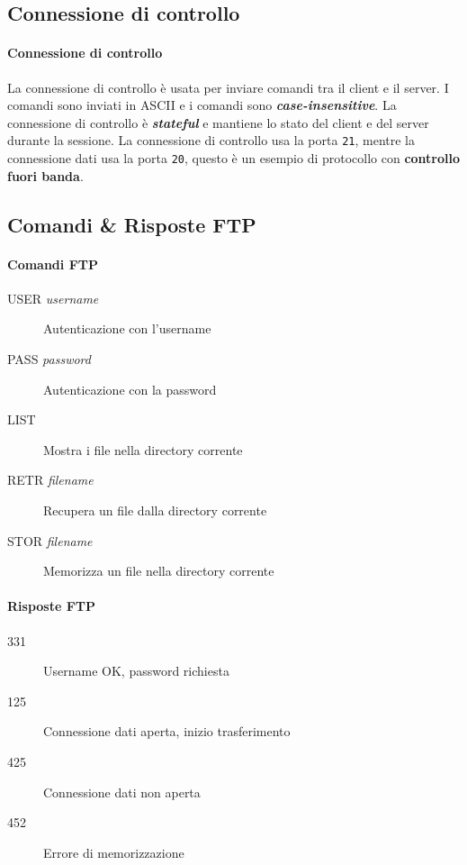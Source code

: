     \subsection{Connessione di controllo}
        \paragraph{Connessione di controllo} La connessione di controllo è usata per inviare comandi tra il client e il server. I comandi sono inviati in \Acrshort*{ASCII} e i comandi sono \textit{\textbf{case-insensitive}}. La connessione di controllo è \textit{\textbf{stateful}} e mantiene lo stato del client e del server durante la sessione. La connessione di controllo usa la porta \texttt{21}, mentre la connessione dati usa la porta \texttt{20}, questo è un esempio di protocollo con \textbf{controllo fuori banda}.
    \subsection[Comandi \& Risposte \texttt{FTP}]{Comandi \& Risposte \Acrshort*{FTP}}
        \paragraph{Comandi \Acrshort*{FTP}}
            \begin{description}
                \item[USER \textit{username}] Autenticazione con l'username
                \item[PASS \textit{password}] Autenticazione con la password
                \item[LIST] Mostra i file nella directory corrente
                \item[RETR \textit{filename}] Recupera un file dalla directory corrente
                \item[STOR \textit{filename}] Memorizza un file nella directory corrente
            \end{description}
        \paragraph{Risposte \Acrshort*{FTP}}
            \begin{description}
                \item[331] Username OK, password richiesta
                \item[125] Connessione dati aperta, inizio trasferimento
                \item[425] Connessione dati non aperta
                \item[452] Errore di memorizzazione
            \end{description}

